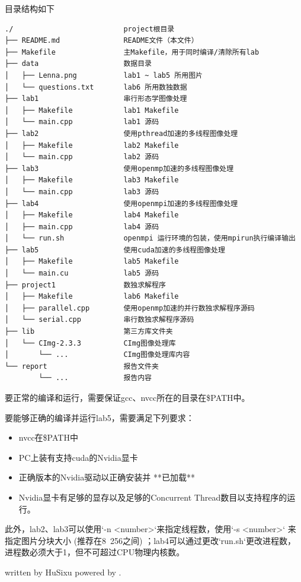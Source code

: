 \documentclass{report}
\begin{document}
\par 目录结构如下
\begin{lstlisting}
./                          project根目录
├── README.md               README文件（本文件）
├── Makefile                主Makefile，用于同时编译/清除所有lab
├── data                    数据目录
│   ├── Lenna.png           lab1 ~ lab5 所用图片
│   └── questions.txt       lab6 所用数独数据
├── lab1                    串行形态学图像处理
│   ├── Makefile            lab1 Makefile
│   └── main.cpp            lab1 源码
├── lab2                    使用pthread加速的多线程图像处理
│   ├── Makefile            lab2 Makefile
│   └── main.cpp            lab2 源码
├── lab3                    使用openmp加速的多线程图像处理
│   ├── Makefile            lab3 Makefile
│   └── main.cpp            lab3 源码
├── lab4                    使用openmpi加速的多线程图像处理
│   ├── Makefile            lab4 Makefile
│   ├── main.cpp            lab4 源码
│   └── run.sh              openmpi 运行环境的包装，使用mpirun执行编译输出
├── lab5                    使用cuda加速的多线程图像处理
│   ├── Makefile            lab5 Makefile
│   └── main.cu             lab5 源码
├── project1                数独求解程序
│   ├── Makefile            lab6 Makefile
│   ├── parallel.cpp        使用openmp加速的并行数独求解程序源码
│   └── serial.cpp          串行数独求解程序源码
├── lib                     第三方库文件夹
│   └── CImg-2.3.3          CImg图像处理库
│       └── ...             CImg图像处理库内容
└── report                  报告文件夹
        └── ...             报告内容
\end{lstlisting}

\par 要正常的编译和运行，需要保证gcc、nvcc所在的目录在\$PATH中。

\par 要能够正确的编译并运行lab5，需要满足下列要求：
\begin{itemize}
    \item nvcc在\$PATH中
    \item PC上装有支持cuda的Nvidia显卡
    \item 正确版本的Nvidia驱动以正确安装并 **已加载**
    \item Nvidia显卡有足够的显存以及足够的Concurrent Thread数目以支持程序的运行。
\end{itemize}

\par 此外，lab2、lab3可以使用`-n <number>`来指定线程数，使用`-s <number>` 来指定图片分块大小 (推荐在8~256之间) ；lab4可以通过更改`run.sh`更改进程数，进程数必须大于1，但不可超过CPU物理内核数。


\vfill
{\tiny written by HuSixu \hfill powered by \XeLaTeX .}
\end{document}
